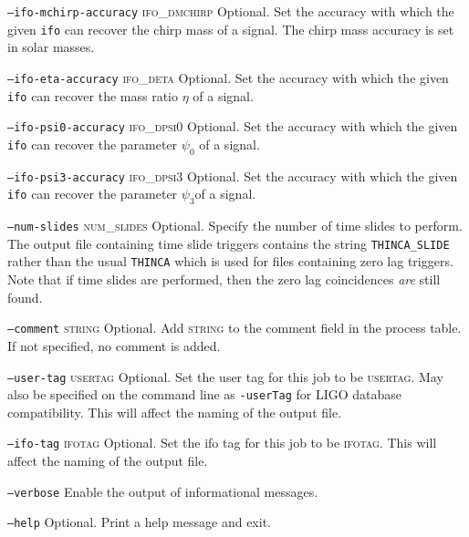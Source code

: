 \begin{entry}
\begin{entry}
\item[\texttt{--ifo-mchirp-accuracy} \textsc{ifo\_dmchirp}] Optional. Set the
accuracy with which the given \texttt{ifo} can recover the chirp mass of a
signal.  The chirp mass accuracy is set in solar masses.

\item[\texttt{--ifo-eta-accuracy} \textsc{ifo\_deta}] Optional. Set the
accuracy with which the given \texttt{ifo} can recover the mass ratio $\eta$
of a signal.

\item[\texttt{--ifo-psi0-accuracy} \textsc{ifo\_dpsi0}] Optional. Set the
accuracy with which the given \texttt{ifo} can recover the parameter
$\psi_{0}$ of a signal.

\item[\texttt{--ifo-psi3-accuracy} \textsc{ifo\_dpsi3}] Optional. Set the
accuracy with which the given \texttt{ifo} can recover the parameter
$\psi_{3}$of a signal.

\item[\texttt{--num-slides} \textsc{num\_slides}] Optional.  Specify the
number of time slides to perform.  The output file containing time slide 
triggers contains the string \texttt{THINCA\_SLIDE} rather than the usual
\texttt{THINCA} which is used for files containing zero lag triggers.  
Note that if time slides are performed, then the zero lag coincidences 
\textit{are} still found.

\item[\texttt{--comment} \textsc{string}] Optional. Add \textsc{string}
to the comment field in the process table. If not specified, no comment
is added. 

\item[\texttt{--user-tag} \textsc{usertag}] Optional. Set the user tag for
this job to be \textsc{usertag}. May also be specified on the command line as
\texttt{-userTag} for LIGO database compatibility.  This will affect the
naming of the output file.

\item[\texttt{--ifo-tag} \textsc{ifotag}] Optional. Set the ifo tag for this
job to be \textsc{ifotag}. This will affect the naming of the output file.

\item[\texttt{--verbose}] Enable the output of informational messages.

\item[\texttt{--help}] Optional.  Print a help message and exit.


\end{entry}
\end{entry}
